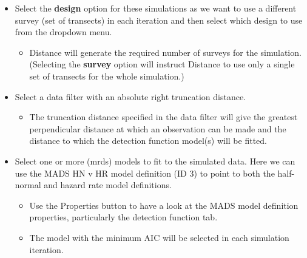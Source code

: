 \documentclass[]{book}
\providecommand{\tightlist}{%
  \setlength{\itemsep}{0pt}\setlength{\parskip}{0pt}}
\theoremstyle{definition}
\theoremstyle{definition}
\theoremstyle{remark}
\begin{document}
\begin{itemize}
\tightlist
\item
  Select the \textbf{design} option for these simulations as we want to
  use a different survey (set of transects) in each iteration and then
  select which design to use from the dropdown menu.

  \begin{itemize}
  \tightlist
  \item
    Distance will generate the required number of surveys for the
    simulation. (Selecting the \textbf{survey} option will instruct
    Distance to use only a single set of transects for the whole
    simulation.)\\
  \end{itemize}
\item
  Select a data filter with an absolute right truncation distance.

  \begin{itemize}
  \tightlist
  \item
    The truncation distance specified in the data filter will give the
    greatest perpendicular distance at which an observation can be made
    and the distance to which the detection function model(s) will be
    fitted.\\
  \end{itemize}
\item
  Select one or more (mrds) models to fit to the simulated data. Here we
  can use the MADS HN v HR model definition (ID 3) to point to both the
  half-normal and hazard rate model definitions.

  \begin{itemize}
  \tightlist
  \item
    Use the Properties button to have a look at the MADS model
    definition properties, particularly the detection function tab.
  \item
    The model with the minimum AIC will be selected in each simulation
    iteration.
  \end{itemize}
\end{itemize}
\end{document}
